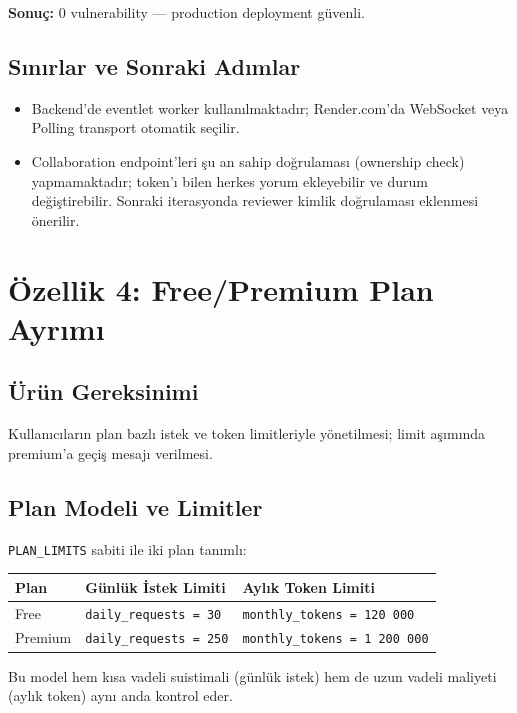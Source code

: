 \documentclass[11pt,a4paper]{article}
\begin{document}
\textbf{Sonuç:} 0 vulnerability — production deployment güvenli.

\subsection{Sınırlar ve Sonraki Adımlar}
\begin{itemize}[leftmargin=1.5em]
  \item Backend'de eventlet worker kullanılmaktadır; Render.com'da WebSocket veya Polling transport otomatik seçilir.
  \item Collaboration endpoint'leri şu an sahip doğrulaması (ownership check) yapmamaktadır; token'ı bilen herkes yorum ekleyebilir ve durum değiştirebilir. Sonraki iterasyonda reviewer kimlik doğrulaması eklenmesi önerilir.
\end{itemize}

\section{Özellik 4: Free/Premium Plan Ayrımı}

\subsection{Ürün Gereksinimi}
Kullanıcıların plan bazlı istek ve token limitleriyle yönetilmesi; limit aşımında premium'a geçiş mesajı verilmesi.

\subsection{Plan Modeli ve Limitler}

\texttt{PLAN\_LIMITS} sabiti ile iki plan tanımlı:

\begin{tabularx}{\textwidth}{@{} L{2.5cm} L{4cm} X @{}}
\toprule
\textbf{Plan} & \textbf{Günlük İstek Limiti} & \textbf{Aylık Token Limiti} \\
\midrule
Free & \texttt{daily\_requests = 30} & \texttt{monthly\_tokens = 120\,000} \\
\addlinespace
Premium & \texttt{daily\_requests = 250} & \texttt{monthly\_tokens = 1\,200\,000} \\
\bottomrule
\end{tabularx}

Bu model hem kısa vadeli suistimali (günlük istek) hem de uzun vadeli maliyeti (aylık token) aynı anda kontrol eder.
\end{document}
